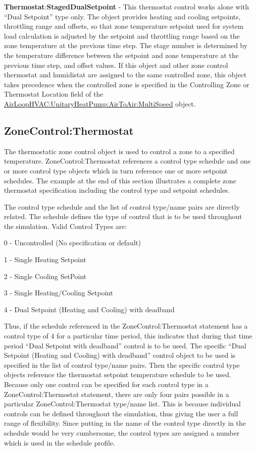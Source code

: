 \textbf{Thermostat}:\textbf{StagedDualSetpoint} - This thermostat control works alone with ``Dual Setpoint'' type only. The object provides heating and cooling setpoints, throttling range and offsets, so that zone temperature setpoint used for system load calculation is adjusted by the setpoint and throttling range based on the zone temperature at the previous time step. The stage number is determined by the temperature difference between the setpoint and zone temperature at the previous time step, and offset values. If this object and other zone control thermostat and humidistat are assigned to the same controlled zone, this object takes precedence when the controlled zone is specified in the Controlling Zone or Thermostat Location field of the \hyperref[airloophvacunitaryheatpumpairtoairmultispeed]{AirLoopHVAC:UnitaryHeatPump:AirToAir:MultiSpeed} object.

\subsection{ZoneControl:Thermostat}\label{zonecontrolthermostat}

The thermostatic zone control object is used to control a zone to a specified temperature. ZoneControl:Thermostat references a control type schedule and one or more control type objects which in turn reference one or more setpoint schedules. The example at the end of this section illustrates a complete zone thermostat specification including the control type and setpoint schedules.

The control type schedule and the list of control type/name pairs are directly related. The schedule defines the type of control that is to be used throughout the simulation. Valid Control Types are:

0 - Uncontrolled (No specification or default)

1 - Single Heating Setpoint

2 - Single Cooling SetPoint

3 - Single Heating/Cooling Setpoint

4 - Dual Setpoint (Heating and Cooling) with deadband

Thus, if the schedule referenced in the ZoneControl:Thermostat statement has a control type of 4 for a particular time period, this indicates that during that time period ``Dual Setpoint with deadband'' control is to be used. The specific ``Dual Setpoint (Heating and Cooling) with deadband'' control object to be used is specified in the list of control type/name pairs. Then the specific control type objects reference the thermostat setpoint temperature schedule to be used. Because only one control can be specified for each control type in a ZoneControl:Thermostat statement, there are only four pairs possible in a particular ZoneControl:Thermostat type/name list. This is because individual controls can be defined throughout the simulation, thus giving the user a full range of flexibility. Since putting in the name of the control type directly in the schedule would be very cumbersome, the control types are assigned a number which is used in the schedule profile.

